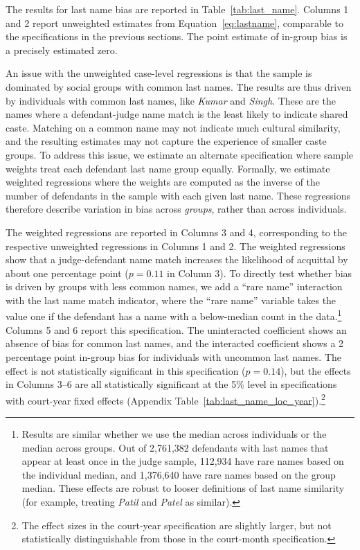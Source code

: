 \documentclass[12pt,english]{article}
\begin{document}
The results for last name bias are reported in Table~\ref{tab:last_name}. Columns 1 and 2 report unweighted estimates from Equation~\ref{eq:lastname}, comparable to the specifications in the previous sections. The point estimate of in-group bias is a precisely estimated zero.

An issue with the unweighted case-level regressions is that the sample is dominated by social groups with common last names. The results are thus driven by individuals with common last names, like \textit{Kumar} and \textit{Singh}. These are the names where a defendant-judge name match is the least likely to indicate shared caste. Matching on a common name may not indicate much cultural similarity, and the resulting estimates may not capture the experience of smaller caste groups. To address this issue, we estimate an alternate specification where sample weights treat each defendant last name group equally. Formally, we estimate weighted regressions where the weights are computed as the inverse of the number of defendants in the sample with each given last name. These regressions therefore describe variation in bias across \textit{groups}, rather than across individuals. 

The weighted regressions are reported in Columns 3 and 4, corresponding to the respective unweighted regressions in Columns 1 and 2. The weighted regressions show that a judge-defendant name match increases the likelihood of acquittal by about one percentage point ($p=0.11$ in Column 3). To directly test whether bias is driven by groups with less common names, we add a ``rare name'' interaction with the last name match indicator, where the ``rare name'' variable takes the value one if the defendant has a name with a below-median count in the data.\footnote{Results are similar whether we use the median across individuals or the median across groups. Out of 2,761,382 defendants with last names that appear at least once in the judge sample, 112,934 have rare names based on the individual median, and 1,376,640 have rare names based on the group median. These effects are robust to looser definitions of last name similarity (for example, treating \textit{Patil} and \textit{Patel} as similar).} Columns 5 and 6 report this specification. The uninteracted coefficient shows an absence of bias for common last names, and the interacted coefficient shows a 2 percentage point in-group bias for individuals with uncommon last names. The effect is not statistically significant in this specification ($p=0.14$), but the effects in Columns 3--6 are all statistically significant at the 5\% level in specifications with court-year fixed effects (Appendix Table~\ref{tab:last_name_loc_year}).\footnote{The effect sizes in the court-year specification are slightly larger, but not statistically distinguishable from those in the court-month specification.}
\end{document}
